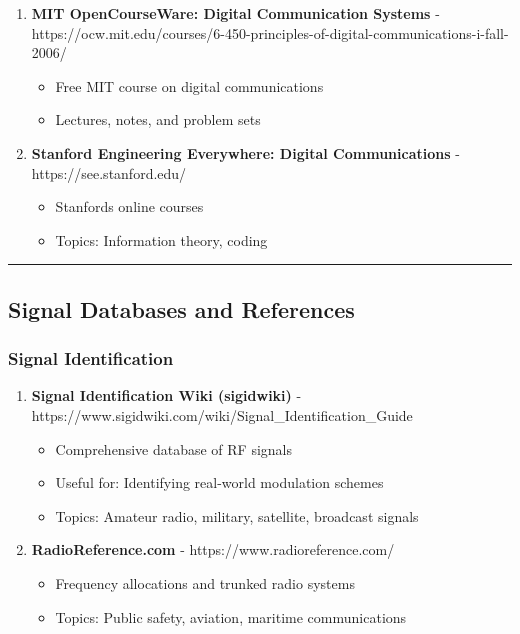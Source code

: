 \begin{enumerate}
\def\labelenumi{\arabic{enumi}.}
\setcounter{enumi}{40}
\tightlist
\item
  \textbf{MIT OpenCourseWare: Digital Communication Systems} -
  https://ocw.mit.edu/courses/6-450-principles-of-digital-communications-i-fall-2006/

  \begin{itemize}
  \tightlist
  \item
    Free MIT course on digital communications
  \item
    Lectures, notes, and problem sets
  \end{itemize}
\item
  \textbf{Stanford Engineering Everywhere: Digital Communications} -
  https://see.stanford.edu/

  \begin{itemize}
  \tightlist
  \item
    Stanford\textquotesingle s online courses
  \item
    Topics: Information theory, coding
  \end{itemize}
\end{enumerate}

\begin{center}\rule{0.5\linewidth}{0.5pt}\end{center}

\subsection{\texorpdfstring{ Signal Databases and
References}{ Signal Databases and References}}\label{signal-databases-and-references}

\subsubsection{Signal Identification}\label{signal-identification}

\begin{enumerate}
\def\labelenumi{\arabic{enumi}.}
\setcounter{enumi}{42}
\tightlist
\item
  \textbf{Signal Identification Wiki (sigidwiki)} -
  https://www.sigidwiki.com/wiki/Signal\_Identification\_Guide

  \begin{itemize}
  \tightlist
  \item
    Comprehensive database of RF signals
  \item
    Useful for: Identifying real-world modulation schemes
  \item
    Topics: Amateur radio, military, satellite, broadcast signals
  \end{itemize}
\item
  \textbf{RadioReference.com} - https://www.radioreference.com/

  \begin{itemize}
  \tightlist
  \item
    Frequency allocations and trunked radio systems
  \item
    Topics: Public safety, aviation, maritime communications
  \end{itemize}
\end{enumerate}

